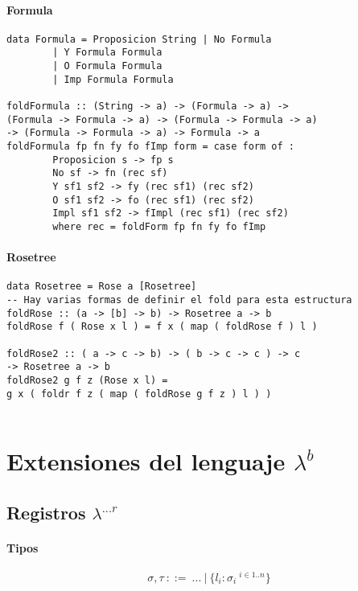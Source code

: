 \paragraph{Formula}
\begin{centrado}
	\begin{verbatim}
data Formula = Proposicion String | No Formula 
		| Y Formula Formula
		| O Formula Formula
		| Imp Formula Formula
		
foldFormula :: (String -> a) -> (Formula -> a) -> 
(Formula -> Formula -> a) -> (Formula -> Formula -> a) 
-> (Formula -> Formula -> a) -> Formula -> a
foldFormula fp fn fy fo fImp form = case form of :
		Proposicion s -> fp s
		No sf -> fn (rec sf)
		Y sf1 sf2 -> fy (rec sf1) (rec sf2)
		O sf1 sf2 -> fo (rec sf1) (rec sf2)
		Impl sf1 sf2 -> fImpl (rec sf1) (rec sf2)
		where rec = foldForm fp fn fy fo fImp
	\end{verbatim}
\end{centrado}

\paragraph{Rosetree}
\begin{centrado}
	\begin{verbatim}
data Rosetree = Rose a [Rosetree]
-- Hay varias formas de definir el fold para esta estructura
foldRose :: (a -> [b] -> b) -> Rosetree a -> b
foldRose f ( Rose x l ) = f x ( map ( foldRose f ) l )
		
foldRose2 :: ( a -> c -> b) -> ( b -> c -> c ) -> c 
-> Rosetree a -> b
foldRose2 g f z (Rose x l) = 
g x ( foldr f z ( map ( foldRose g f z ) l ) )
		
	\end{verbatim}
\end{centrado}


\newpage
\section{Extensiones del lenguaje \texorpdfstring{$\lambda^b$}{lambda b}}



\subsection{Registros \texorpdfstring{$\lambda^{...r}$}{lambda ...r}}

\paragraph{Tipos}
$$\sigma, \tau ~::=~...~|~\{l_i : \sigma_i ~^{i\in 1..n}\}$$

